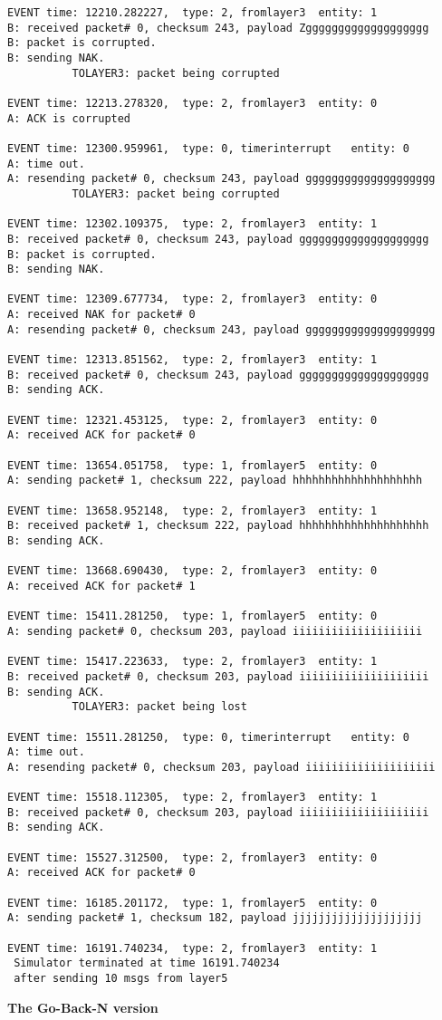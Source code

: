 \documentclass[12pt]{article}
\begin{document}
\begin{verbatim}
EVENT time: 12210.282227,  type: 2, fromlayer3  entity: 1
B: received packet# 0, checksum 243, payload Zggggggggggggggggggg
B: packet is corrupted.
B: sending NAK.
          TOLAYER3: packet being corrupted

EVENT time: 12213.278320,  type: 2, fromlayer3  entity: 0
A: ACK is corrupted

EVENT time: 12300.959961,  type: 0, timerinterrupt   entity: 0
A: time out. 
A: resending packet# 0, checksum 243, payload gggggggggggggggggggg
          TOLAYER3: packet being corrupted

EVENT time: 12302.109375,  type: 2, fromlayer3  entity: 1
B: received packet# 0, checksum 243, payload gggggggggggggggggggg
B: packet is corrupted.
B: sending NAK.

EVENT time: 12309.677734,  type: 2, fromlayer3  entity: 0
A: received NAK for packet# 0
A: resending packet# 0, checksum 243, payload gggggggggggggggggggg

EVENT time: 12313.851562,  type: 2, fromlayer3  entity: 1
B: received packet# 0, checksum 243, payload gggggggggggggggggggg
B: sending ACK.

EVENT time: 12321.453125,  type: 2, fromlayer3  entity: 0
A: received ACK for packet# 0

EVENT time: 13654.051758,  type: 1, fromlayer5  entity: 0
A: sending packet# 1, checksum 222, payload hhhhhhhhhhhhhhhhhhhh

EVENT time: 13658.952148,  type: 2, fromlayer3  entity: 1
B: received packet# 1, checksum 222, payload hhhhhhhhhhhhhhhhhhhh
B: sending ACK.

EVENT time: 13668.690430,  type: 2, fromlayer3  entity: 0
A: received ACK for packet# 1

EVENT time: 15411.281250,  type: 1, fromlayer5  entity: 0
A: sending packet# 0, checksum 203, payload iiiiiiiiiiiiiiiiiiii

EVENT time: 15417.223633,  type: 2, fromlayer3  entity: 1
B: received packet# 0, checksum 203, payload iiiiiiiiiiiiiiiiiiii
B: sending ACK.
          TOLAYER3: packet being lost

EVENT time: 15511.281250,  type: 0, timerinterrupt   entity: 0
A: time out. 
A: resending packet# 0, checksum 203, payload iiiiiiiiiiiiiiiiiiii

EVENT time: 15518.112305,  type: 2, fromlayer3  entity: 1
B: received packet# 0, checksum 203, payload iiiiiiiiiiiiiiiiiiii
B: sending ACK.

EVENT time: 15527.312500,  type: 2, fromlayer3  entity: 0
A: received ACK for packet# 0

EVENT time: 16185.201172,  type: 1, fromlayer5  entity: 0
A: sending packet# 1, checksum 182, payload jjjjjjjjjjjjjjjjjjjj

EVENT time: 16191.740234,  type: 2, fromlayer3  entity: 1
 Simulator terminated at time 16191.740234
 after sending 10 msgs from layer5
\end{verbatim}
\large{\textbf{The Go-Back-N version}}
\normalsize
\end{document}
